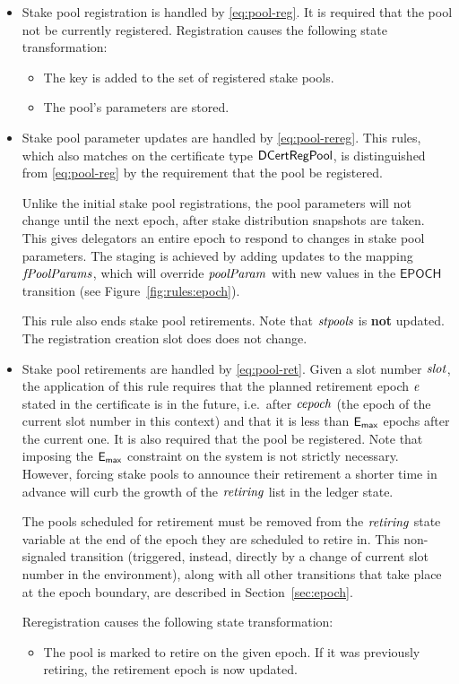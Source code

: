 \begin{itemize}
  \item Stake pool registration is handled by \cref{eq:pool-reg}.
    It is required that the pool not be currently registered.
    Registration causes the following state transformation:
    \begin{itemize}
      \item The key is added to the set of registered stake pools.
      \item The pool's parameters are stored.
    \end{itemize}
  \item Stake pool parameter updates are handled by \cref{eq:pool-rereg}.
    This rules, which also matches on the certificate type $\mathsf{DCertRegPool}$,
    is distinguished from \cref{eq:pool-reg} by the requirement that the pool be registered.

    Unlike the initial stake pool registrations, the pool parameters will not change
    until the next epoch, after stake distribution snapshots are taken.
    This gives delegators an entire epoch to respond to changes in stake pool parameters.
    The staging is achieved by adding updates to the mapping $\mathit{fPoolParams}$,
    which will override $\mathit{poolParam}$ with new values in the $\mathsf{EPOCH}$ transition
    (see Figure~\cref{fig:rules:epoch}).

    This rule also ends stake pool retirements.
    Note that $\mathit{stpools}$ is \textbf{not} updated.
    The registration creation slot does does not change.
  \item Stake pool retirements are handled by \cref{eq:pool-ret}.
    Given a slot number $\mathit{slot}$, the application of this rule requires that the
    planned retirement epoch $\mathit{e}$ stated in the certificate is in the future,
    i.e.~after $\mathit{cepoch}$ (the epoch of the current slot number in this context) and
    that it is less than $\mathsf{E_{max}}$ epochs after the current one.
    It is also required that the pool be registered.
    Note that imposing the $\mathsf{E_{max}}$ constraint on the system is not strictly necessary.
    However, forcing stake pools to announce their retirement a shorter time in
    advance will curb the growth of the $\mathit{retiring}$ list in the ledger state.

    The pools scheduled for retirement must be removed from
    the $\mathit{retiring}$ state variable at the end of the epoch they are scheduled
    to retire in. This non-signaled transition (triggered, instead, directly by a
    change of current slot number in the environment), along with all other transitions
    that take place at the epoch boundary, are described in Section~\ref{sec:epoch}.

    Reregistration causes the following state transformation:
    \begin{itemize}
      \item The pool is marked to retire on the given epoch.
        If it was previously retiring, the retirement epoch is now updated.
    \end{itemize}
\end{itemize}

